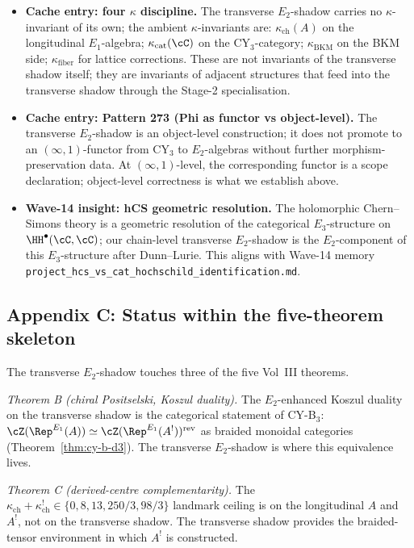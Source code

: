 \begin{itemize}
\item \textbf{Cache entry: four $\kappa$ discipline.}  The transverse
$E_2$-shadow carries no $\kappa$-invariant of its own; the ambient
$\kappa$-invariants are:
$\kappa_{\mathrm{ch}}(A)$ on the longitudinal $E_1$-algebra;
$\kappa_{\mathrm{cat}}(\cC)$ on the CY$_3$-category; $\kappa_{\mathrm{BKM}}$
on the BKM side; $\kappa_{\mathrm{fiber}}$ for lattice corrections.
These are not invariants of the transverse shadow itself; they are
invariants of adjacent structures that feed into the transverse
shadow through the Stage-2 specialisation.

\item \textbf{Cache entry: Pattern 273 (Phi as functor vs object-level).}
The transverse $E_2$-shadow is an object-level construction; it does
not promote to an $(\infty, 1)$-functor from CY$_3$ to $E_2$-algebras
without further morphism-preservation data.  At $(\infty, 1)$-level,
the corresponding functor is a scope declaration; object-level
correctness is what we establish above.

\item \textbf{Wave-14 insight: hCS geometric resolution.}  The
holomorphic Chern--Simons theory is a geometric resolution of the
categorical $E_3$-structure on $\HH^\bullet(\cC, \cC)$; our chain-level
transverse $E_2$-shadow is the $E_2$-component of this $E_3$-structure
after Dunn--Lurie.  This aligns with Wave-14 memory
\texttt{project\_hcs\_vs\_cat\_hochschild\_identification.md}.
\end{itemize}

\subsection*{Appendix C: Status within the five-theorem skeleton}

The transverse $E_2$-shadow touches three of the five Vol~III theorems.

\emph{Theorem B (chiral Positselski, Koszul duality).}  The
$E_2$-enhanced Koszul duality on the transverse shadow is the
categorical statement of CY-B$_3$:
$\cZ(\Rep^{E_1}(A)) \simeq \cZ(\Rep^{E_1}(A^!))^{\mathrm{rev}}$ as
braided monoidal categories (Theorem~\ref{thm:cy-b-d3}).  The
transverse $E_2$-shadow is where this equivalence lives.

\emph{Theorem C (derived-centre complementarity).}  The
$\kappa_{\mathrm{ch}} + \kappa^!_{\mathrm{ch}} \in \{0, 8, 13, 250/3,
98/3\}$ landmark ceiling is on the longitudinal $A$ and $A^!$, not on
the transverse shadow.  The transverse shadow provides the
braided-tensor environment in which $A^!$ is constructed.

